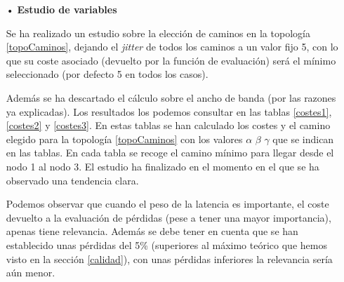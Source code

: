 \documentclass[a4paper,11pt]{book}
\begin{document}
\begin{itemize}
\item[•] \textbf{Estudio de variables}

Se ha realizado un estudio sobre la elección de caminos en la topología \ref{topoCaminos}, dejando el \textit{jitter} de todos los caminos a un valor fijo 5, con lo que su coste asociado (devuelto por la función de evaluación) será el mínimo seleccionado (por defecto 5 en todos los casos).

Además se ha descartado el cálculo sobre el ancho de banda (por las razones ya explicadas). Los resultados los podemos consultar en las tablas \ref{costes1}, \ref{costes2} y \ref{costes3}. En estas tablas se han calculado los costes y el camino elegido para la topología \ref{topoCaminos} con los valores $\alpha$ $\beta$ $\gamma$ que se indican en las tablas. En cada tabla se recoge el camino mínimo para llegar desde el nodo 1 al nodo 3. El estudio ha finalizado en el momento en el que se ha observado una tendencia clara.

Podemos observar que cuando el peso de la latencia es importante, el coste devuelto a la evaluación de pérdidas (pese a tener una mayor importancia), apenas tiene relevancia. Además se debe tener en cuenta que se han establecido unas pérdidas del 5\% (superiores al máximo teórico que hemos visto en la sección \ref{calidad}), con unas pérdidas inferiores la relevancia sería aún menor.


\end{itemize}
\end{document}

